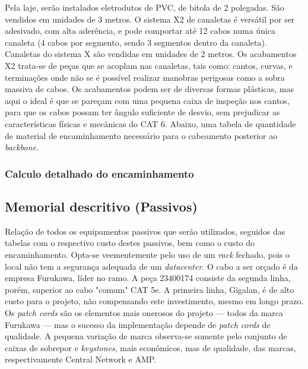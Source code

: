 \documentclass[	DIV=calc,%
							paper=a4,%
							fontsize=12pt,%
							onecolumn]{scrartcl}	 					%
\begin{document}
Pela laje, serão instalados eletrodutos de PVC, de bitola de 2 polegadas. São vendidos em unidades de 3 metros. O sistema X2 de canaletas é versátil por ser adesivado, com alta aderência, e pode comportar até 12 cabos numa única canaleta (4 cabos por segmento, sendo 3 segmentos dentro da canaleta). Canaletas do sistema X são vendidas em unidades de 2 metros. Os acabamentos X2 trata-se de peças que se acoplam nas canaletas, tais como: cantos, curvas, e terminações onde não se é possível realizar manobras perigosas como a sobra massiva de cabos. Os acabamentos podem ser de diversas formas plásticas, mas aqui o ideal é que se pareçam com uma pequena caixa de inspeção nos cantos, para que os cabos possam ter ângulo suficiente de desvio, sem prejudicar as características físicas e mecânicas do CAT 6. Abaixo, uma tabela de quantidade de material de encaminhamento necessário para o cabeamento posterior ao \textit{backbone}.






\subsubsection{Calculo detalhado do encaminhamento}








\subsection{Memorial descritivo (Passivos)}

Relação de todos os equipamentos passivos que serão utilizados, seguidos das tabelas com o respectivo custo destes passivos, bem como o custo do encaminhamento. Opta-se veementemente pelo uso de um \textit{rack} fechado, pois o local não tem a segurança adequada de um \textit{datacenter}. O cabo a ser orçado é da empresa Furukawa, líder no ramo. A peça 23400174 consiste da segunda linha, porém, superior ao cabo "comum" CAT 5e. A primeira linha, Gigalan, é de alto custo para o projeto, não compensando este investimento, mesmo em longo prazo. Os \textit{patch cords} são os elementos mais onerosos do projeto --- todos da marca Furukawa --- mas o sucesso da implementação depende de \textit{patch cords} de qualidade. A pequena variação de marca observa-se somente pelo conjunto de caixas de sobrepor e \textit{keystones}, mais econômicos, mas de qualidade, das marcas, respectivamente Central Network e AMP.
\end{document}
